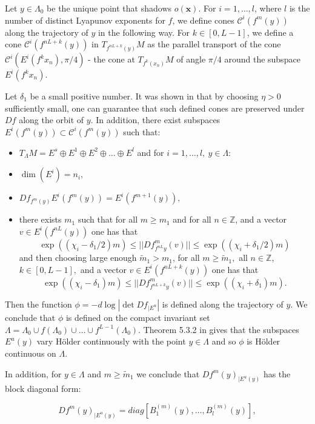 \documentclass{amsart}
\theoremstyle{plain}
\theoremstyle{definition}
\theoremstyle{remark}
\numberwithin{equation}{section}
\begin{document}
Let $y\in \Lambda_0 $ be the unique point that shadows $o(\textbf{x})$.  For  $i=1,\ldots, l$, where $l$ is the number of distinct Lyapunov exponents for $f$,
we define cones  $\mathcal{C}^i(f^m(y))$ along the trajectory of $y$ in the following way.
 For $k\in [0,L-1]$, we define a cone $\mathcal{C}^i(  f^{nL + k  }   (y))$ in $ T_{f^{nL + k  }   (y)} M$
as the parallel transport of the cone $\mathcal{C}^i   ( E^i (f^k x_n), \pi/4   )$ - the cone at $ T_{f^k (x_n)}M$ of angle $\pi/4$ around the subspace  $E^i (f^k x_n)$.

Let $\delta_1$ be a small positive number. It was shown in  \cite{ACW} that by choosing $\eta>0$ sufficiently small, one can guarantee that such defined cones are preserved under $Df$ along the orbit of $y$.
In addition, there exist  subspaces $E^i     (f^ m( y))   \subset \mathcal{C}^i(  f^{m }   (y))  $ such that:
\begin{itemize}
\item $ T_{\Lambda}M = E^s \oplus E^1 \oplus E^2 \oplus \ldots \oplus E^l$ and for $i=1,\ldots, l,~ y\in\Lambda:$
\item $\dim (E^i) = n_i,$
\item $Df_{f^m(y)} E^i     (f^ m( y))   = E^i     (f^{ m+1}( y)),$
\item there exists $m_1$ such that for all $m\geq m_1$ and for all $n\in\mathbb{Z}$, and a vector $v\in E^i( f^{nL}(y))$ one has that
$$  \exp ((\chi_i - \delta_1/2)m)  \leq || Df^{m}_{f^{nL}y}(v)  || \leq  \exp ((\chi_i + \delta_1/2)m)  $$
and then choosing large enough $\tilde{m}_1> m_1$, for all $m\geq \tilde{m}_1, $  all $n\in\mathbb{Z}$, $k\in[0,L-1],$ and a vector $v\in E^i( f^{nL+k}(y))$ one has that
$$  \exp ((\chi_i - \delta_1)m)  \leq || Df^{ m}_{f^{nL+k}y}(v)  || \leq  \exp ((\chi_i + \delta_1)m).  $$
\end{itemize}
Then the function $\phi = -d \log |\det Df_{| E^u}| $ is defined along the trajectory of $y$. We conclude that $\phi$ is defined on the compact invariant set
 $\Lambda= \Lambda_0 \cup f(\Lambda_0)\cup \ldots \cup f^{L-1}(\Lambda_0)$.
 Theorem 5.3.2 in \cite{pesRed} gives that the subspaces $E^u(y)$ vary H\"older continuously with the point $y\in\Lambda$ and so $\phi$ is H\"older continuous on $\Lambda$.



In addition, for $y\in\Lambda$ and $m\geq \tilde{m}_1$  we conclude that $Df^m(y)_{| E^u(y)}$ has the block diagonal form:


$$Df^m(y)_{| E^u(y)}=  diag[ B^{(m)}_1(y), \ldots, B^{(m)}_l(y)  ] ,$$
\end{document}
